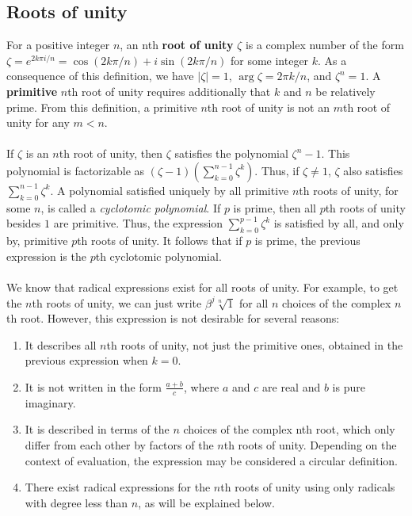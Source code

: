 \documentclass{article}
\begin{document}
    \subsection{Roots of unity}
    For a positive integer $ n $, an nth \textbf{root of unity} $ \zeta $ is a complex number of the form $ \zeta = e^{2k\pi i/n} = \cos(2k\pi /n) + i \sin(2k\pi /n) $ for some integer $ k $. As a consequence of this definition, we have $ |\zeta| = 1 $, $ \arg \zeta = 2 \pi k/n $, and $ \zeta^n = 1 $. A \textbf{primitive} $ n $th root of unity requires additionally that $ k $ and $ n $ be relatively prime. From this definition, a primitive $ n $th root of unity is not an $ m $th root of unity for any $ m < n $.\\
    \\
    If $ \zeta $ is an $ n $th root of unity, then $ \zeta $ satisfies the polynomial $ \zeta^n - 1 $. This polynomial is factorizable as $ (\zeta - 1)(\sum_{k = 0}^{n - 1} \zeta^k) $. Thus, if $ \zeta \ne 1 $, $ \zeta $ also satisfies $ \sum_{k = 0}^{n - 1} \zeta^k $. A polynomial satisfied uniquely by all primitive $ n $th roots of unity, for some $ n $, is called a \textit{cyclotomic polynomial}. If $ p $ is prime, then all $ p $th roots of unity besides $ 1 $ are primitive. Thus, the expression $ \sum_{k = 0}^{p - 1} \zeta^k $ is satisfied by all, and only by, primitive $ p $th roots of unity. It follows that if $ p $ is prime, the previous expression is the $ p $th cyclotomic polynomial.\\
    \\
    We know that radical expressions exist for all roots of unity. For example, to get the $ n $th roots of unity, we can just write $ \beta^j \sqrt[n]{1} $ for all $ n $ choices of the complex $ n $th root. However, this expression is not desirable for several reasons:
    \begin{enumerate}
        \item It describes all $ n $th roots of unity, not just the primitive ones, obtained in the previous expression when $ k = 0 $.
        \item It is not written in the form $ \frac{a + b}{c} $, where $ a $ and $ c $ are real and $ b $ is pure imaginary.
        \item It is described in terms of the $ n $ choices of the complex nth root, which only differ from each other by factors of the $ n $th roots of unity. Depending on the context of evaluation, the expression may be considered a circular definition.
        \item There exist radical expressions for the $ n $th roots of unity using only radicals with degree less than $ n $, as will be explained below.
    \end{enumerate}
\end{document}
